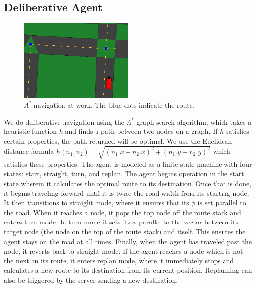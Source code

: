 \documentclass{article}
\begin{document}
\subsection{Deliberative Agent}
\begin{figure}[h]
  \begin{center}
    \includegraphics[width=0.5\textwidth]{astar}
  \end{center}
  \caption{$A^*$ navigation at work. The blue dots indicate the route.}
  \label{astar}
\end{figure}
We do deliberative navigation using the $A^*$ graph search algorithm,
which takes a heuristic function $h$ and finds a path between two
nodes on a graph. If $h$ satisfies certain properties, the path
returned will be optimal. We use the Euclidean distance formula
$h(n_1, n_2)=\sqrt{(n_1.x - n_2.x)^2 + (n_1.y - n_2.y)^2}$ which
satisfies these properties. The agent is modeled as a finite state
machine with four states: start, straight, turn, and replan. The agent
begins operation in the start state wherein it calculates the optimal
route to its destination. Once that is done, it begins traveling
forward until it is twice the road width from its starting node. It
then transitions to straight mode, where it ensures that its $\phi$ is
set parallel to the road. When it reaches a node, it pops the top node
off the route stack and enters turn mode. In turn mode it sets its
$\phi$ parallel to the vector between its target node (the node on the
top of the route stack) and itself. This ensures the agent stays on
the road at all times. Finally, when the agent has traveled past the
node, it reverts back to straight mode. If the agent reaches a node
which is not the next on its route, it enters replan mode, where it
immediately stops and calculates a new route to its destination from
its current position. Replanning can also be triggered by the server
sending a new destination.
\end{document}
